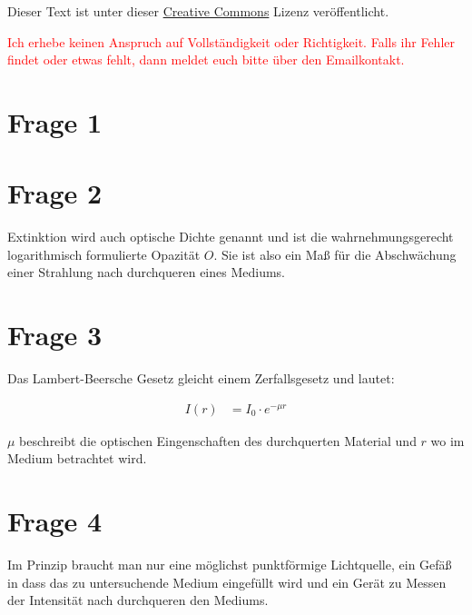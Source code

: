 




\maketitle

Dieser Text ist unter dieser \href{http://creativecommons.org/licenses/by-nc-sa/4.0/}{Creative Commons} Lizenz veröffentlicht.

\textcolor{red}{Ich erhebe keinen Anspruch auf Vollständigkeit oder Richtigkeit. Falls ihr Fehler findet oder etwas fehlt, dann meldet euch bitte über den Emailkontakt.}

\tableofcontents


\newpage

\section{Frage 1}


\section{Frage 2}

Extinktion wird auch optische Dichte genannt und ist die wahrnehmungsgerecht logarithmisch formulierte Opazität $O$. Sie ist also ein Maß für die Abschwächung einer Strahlung nach durchqueren eines Mediums.


\section{Frage 3}

Das Lambert-Beersche Gesetz gleicht einem Zerfallsgesetz und lautet:

\begin{align*}
I(r) &= I_0 \cdot e^{-\mu r} 
\end{align*}

$\mu$ beschreibt die optischen Eingenschaften des durchquerten Material und $r$ wo im Medium betrachtet wird.


\section{Frage 4}

Im Prinzip braucht man nur eine möglichst punktförmige Lichtquelle, ein Gefäß in dass das zu untersuchende Medium eingefüllt wird und ein Gerät zu Messen der Intensität nach durchqueren den Mediums.


